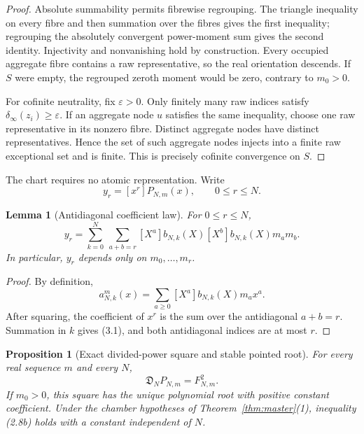 \documentclass[11pt]{article}
\newtheorem{proposition}[theorem]{Proposition}
\newtheorem{lemma}[theorem]{Lemma}
\theoremstyle{remark}
\begin{document}
\begin{proof}
Absolute summability permits fibrewise regrouping.  The triangle inequality on every fibre and
then summation over the fibres gives the first inequality; regrouping the absolutely convergent
power-moment sum gives the second identity.  Injectivity and nonvanishing hold by construction.
Every occupied aggregate fibre contains a raw representative, so the real orientation descends.
If $S$ were empty, the regrouped zeroth moment would be zero, contrary to $m_0>0$.

For cofinite neutrality, fix $\varepsilon>0$.  Only finitely many raw indices satisfy
$\delta_\infty(z_i)\ge\varepsilon$.  If an aggregate node $u$ satisfies the same inequality,
choose one raw representative in its nonzero fibre.  Distinct aggregate nodes have distinct
representatives.  Hence the set of such aggregate nodes injects into a finite raw exceptional
set and is finite.  This is precisely cofinite convergence on $S$.
\end{proof}

The chart requires no atomic representation.  Write
\[
 y_r=[x^r]P_{N,m}(x),\qquad0\le r\le N.
\]

\begin{lemma}[Antidiagonal coefficient law]
\label{lem:antidiagonal}
For $0\le r\le N$,
\begin{equation}
 y_r=\sum_{k=0}^N\ \sum_{a+b=r}
 [X^a]b_{N,k}(X)[X^b]b_{N,k}(X)m_am_b.
 \tag{3.1}
\end{equation}
In particular, $y_r$ depends only on $m_0,\ldots,m_r$.
\end{lemma}

\begin{proof}
By definition,
\[
 a^m_{N,k}(x)=\sum_{a\ge0}[X^a]b_{N,k}(X)m_ax^a.
\]
After squaring, the coefficient of $x^r$ is the sum over the antidiagonal $a+b=r$.  Summation in
$k$ gives (3.1), and both antidiagonal indices are at most $r$.
\end{proof}

\begin{proposition}[Exact divided-power square and stable pointed root]
\label{prop:dividedpower}
For every real sequence $m$ and every $N$,
\[
 \mathfrak D_NP_{N,m}=F_{N,m}^{2}.
\]
If $m_0>0$, this square has the unique polynomial root with positive constant coefficient.
Under the chamber hypotheses of Theorem~\ref{thm:master}(1), inequality \emph{(2.8b)} holds with
a constant independent of $N$.
\end{proposition}
\end{document}
